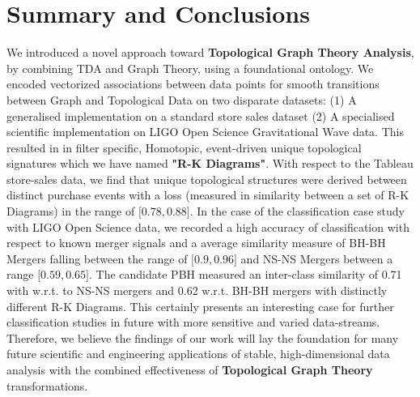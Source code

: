 \section{Summary and Conclusions}

We introduced a novel approach toward \textbf{Topological Graph Theory Analysis}, by combining TDA and Graph Theory, using a foundational ontology. We encoded vectorized associations between data points for smooth transitions between Graph and Topological Data on two disparate datasets: (1) A generalised implementation on a standard store sales dataset\cite{TableauSuperStore} (2) A specialised scientific implementation on LIGO Open Science Gravitational Wave data. This resulted in in filter specific, Homotopic, event-driven unique topological signatures which we have named \textbf{"R-K Diagrams"}. With respect to the Tableau store-sales data, we find that unique topological structures were derived between distinct purchase events with a loss (measured in similarity between a set of R-K Diagrams) in the range of $\lbrack0.78, 0.88\rbrack$. In the case of the classification case study with LIGO Open Science data, we recorded a high accuracy of classification with respect to known merger signals and a average similarity measure of BH-BH Mergers falling between the range of  $\lbrack0.9, 0.96\rbrack$ and NS-NS Mergers between a range   $\lbrack0.59, 0.65\rbrack$. The candidate PBH measured an inter-class similarity of 0.71 with w.r.t. to NS-NS mergers and 0.62 w.r.t. BH-BH mergers with distinctly different R-K Diagrams. This certainly presents an interesting case for further classification studies in future with more sensitive and varied data-streams. Therefore, we believe the findings of our work will lay the foundation for many future scientific and engineering applications of stable, high-dimensional data analysis with the combined effectiveness of \textbf{Topological Graph Theory} transformations.

